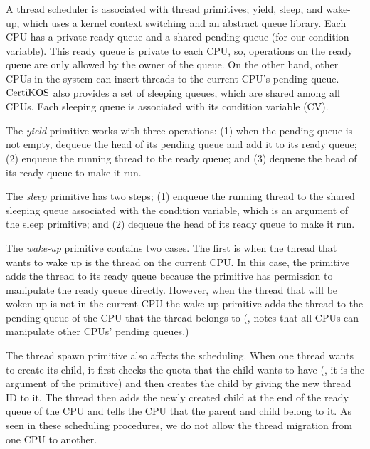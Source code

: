 A thread scheduler is associated with thread primitives; yield, sleep, and wake-up, which uses a kernel context switching and an abstract queue library. 
Each CPU has a private ready queue and a shared pending queue (for our condition variable).
This ready queue is private to each CPU, so, operations on the ready queue are only allowed by the owner of the queue.
On the other hand, other CPUs in the system can insert threads to the current CPU’s pending queue. 
$\mathrm{CertiKOS}$  also provides a set of sleeping queues, which are shared among all CPUs.
Each sleeping queue is associated with its condition variable (CV).

The \textit{yield} primitive works with three operations:
(1) when the pending queue is not empty, dequeue the head of its pending queue and add it to its ready queue;
(2) enqueue the running thread to the ready queue; and 
(3) dequeue the head of its ready queue to make it run.

The \textit{sleep} primitive has two steps;
(1) enqueue the running thread to the shared sleeping queue associated with the condition variable, which is an argument of the sleep primitive; and
(2) dequeue the head of its ready queue to make it run.

The \textit{wake-up} primitive contains two cases. 
The first is when the thread that wants to wake up is the thread on the current CPU. 
In this case, the primitive adds the thread to its ready queue because the primitive has permission to manipulate the ready queue directly.
However, when the thread that will be woken up is not in the current CPU the wake-up primitive adds the thread to the pending queue of the CPU
that the thread belongs to (\ie, notes that all CPUs can manipulate other CPUs' pending queues.) 


The thread spawn primitive also affects the scheduling.
When one thread wants to create its child, 
it first checks the quota that the child wants to have (\ie, it is the argument of the primitive)
and then creates the child by giving the new thread ID to it.
The thread then adds the newly created child at the end of the ready queue of the CPU and tells the CPU that the parent and child belong to it.
As seen in these scheduling procedures, we do not allow the thread migration from one CPU to another.

